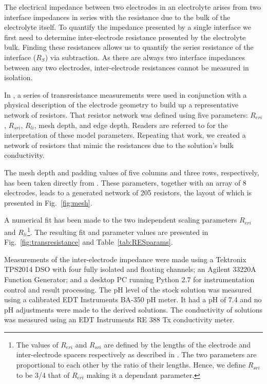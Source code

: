 \documentclass[journal, a4paper]{IEEEtran}
\begin{document}
The electrical impedance between two electrodes in an electrolyte arises from two interface impedances in series with the resistance due to the bulk of the electrolyte itself. To quantify the impedance presented by a single interface we first need to determine inter-electrode resistance presented by the electrolyte bulk. Finding these resistances allows us to quantify the series resistance of the interface ($R_{S}$) via subtraction. As there are always two interface impedances between any two electrodes, inter-electrode resistances cannot be measured in isolation.

In \cite{ScottSingle2013}, a series of transresistance measurements were used in conjunction with a physical description of the electrode geometry to build up a representative network of resistors. That resistor network was defined using five parameters: $R_{eri}$, $R_{sri}$, $R_{li}$, mesh depth, and edge depth. Readers are referred to \cite{ScottSingle2013} for the interpretation of these model parameters. Repeating that work, we created a network of resistors that mimic the resistances due to the solution's bulk conductivity.

The mesh depth and padding values of five columns and three rows, respectively, has been taken directly from \cite{ScottSingle2013}. These parameters, together with an array of 8 electrodes, leads to a generated network of 205 resistors, the layout of which is presented in Fig.~\ref{fig:mesh}.

A numerical fit has been made to the two independent scaling parameters $R_{eri}$ and $R_{li}$\footnote{The values of $R_{eri}$ and $R_{sri}$ are defined by the lengths of the electrode and inter-electrode spacers respectively as described in \cite{ScottSingle2013}. The two parameters are proportional to each other by the ratio of their lengths. Hence, we define $R_{sri}$ to be 3/4 that of $R_{eri}$ making it a dependant parameter.}.
The resulting fit and parameter values are presented in Fig.~\ref{fig:transresistance} and Table~\ref{tab:RESparams}.

Measurements of the inter-electrode impedance were made using a Tektronix TPS2014 DSO with four fully isolated and floating channels; an Agilent 33220A Function Generator; and a desktop PC running Python 2.7 for instrumentation control and result processing. The pH level of the stock solution was measured using a calibrated EDT Instruments BA-350 pH meter. It had a pH of 7.4 and no pH adjustments were made to the derived solutions. The conductivity of solutions was measured using an EDT Instruments RE 388 Tx conductivity meter.
\end{document}
